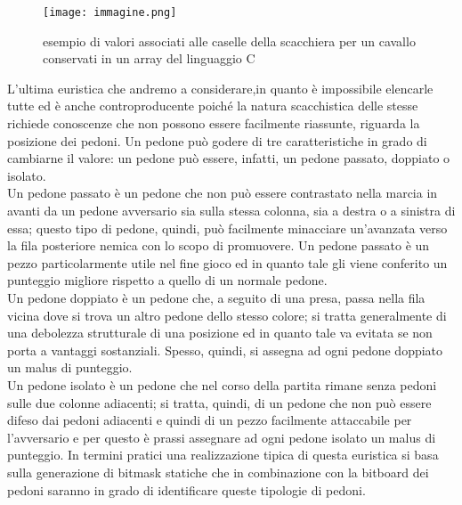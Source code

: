 \begin{figure}
    \centering
    \texttt{[image: immagine.png]}
    \caption{esempio di valori associati alle caselle della scacchiera per un cavallo conservati in un array del linguaggio C}
\end{figure}

L'ultima euristica che andremo a considerare,in quanto è impossibile elencarle tutte ed è anche controproducente poiché la natura scacchistica delle stesse richiede conoscenze che non possono essere facilmente riassunte,
riguarda la posizione dei pedoni. Un pedone può godere di tre caratteristiche in grado di cambiarne il valore: un pedone può essere, infatti, un pedone passato, doppiato o isolato.\\
Un pedone passato è un pedone che non può essere contrastato nella marcia in avanti da un pedone avversario sia sulla stessa colonna, sia a destra o a sinistra di essa; questo tipo di pedone, quindi, può facilmente 
minacciare un'avanzata verso la fila posteriore nemica con lo scopo di promuovere. Un pedone passato è un pezzo particolarmente utile nel fine gioco ed in quanto tale gli viene conferito un punteggio migliore
rispetto a quello di un normale pedone.\\ 
Un pedone doppiato è un pedone che, a seguito di una presa, passa nella fila vicina dove si trova un altro pedone dello stesso colore; si tratta generalmente di una debolezza strutturale di una posizione 
ed in quanto tale va evitata se non porta a vantaggi sostanziali. Spesso, quindi, si assegna ad ogni pedone doppiato un malus di punteggio.\\
Un pedone isolato è un pedone che nel corso della partita rimane senza pedoni sulle due colonne adiacenti; si tratta, quindi, di un pedone che non può essere difeso dai pedoni adiacenti e quindi di un pezzo
facilmente attaccabile per l'avversario e per questo è prassi assegnare ad ogni pedone isolato un malus di punteggio.
In termini pratici una realizzazione tipica di questa euristica si basa sulla generazione di bitmask statiche che in combinazione con la bitboard dei pedoni saranno in grado di identificare queste tipologie di pedoni.


